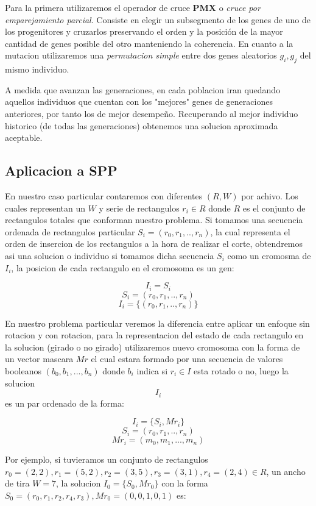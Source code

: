 \documentclass[10pt]{article}
\begin{document}
Para la primera utilizaremos el operador de cruce \textbf{PMX} o \textit{cruce por emparejamiento parcial}. Consiste en elegir un subsegmento de los genes de uno de los progenitores y cruzarlos preservando el orden y la posición de la mayor cantidad de genes posible del otro manteniendo la coherencia.
En cuanto a la mutacion utilizaremos una \textit{permutacion simple} entre dos genes aleatorios $g_i,g_j$ del mismo individuo.

A medida que avanzan las generaciones, en cada poblacion iran quedando aquellos individuos que cuentan con los "mejores"  genes de generaciones anteriores, por tanto los de mejor desempeño. Recuperando al mejor individuo historico (de todas las generaciones) obtenemos una solucion aproximada aceptable.

\subsection{Aplicacion a SPP}
En nuestro caso particular contaremos con diferentes $(R,W)$ por achivo. Los cuales representan un $W$ y serie de rectangulos $r_i \in R$ donde $R$ es el conjunto de rectangulos totales que conforman nuestro problema. Si tomamos una secuencia ordenada de rectangulos particular $S_i = (r_0,r_1,..,r_n)$, la cual representa el orden de insercion de los rectangulos a la hora de realizar el corte, obtendremos asi una solucion o individuo si tomamos dicha secuencia $S_i$ como un cromosma de $I_i$, la posicion de cada rectangulo en el cromosoma es un gen:

$$I_i = S_i$$
$$S_i = (r_0,r_1,..,r_n)$$
$$I_i = \{(r_0,r_1,..,r_n)\}$$

En nuestro problema particular veremos la diferencia entre aplicar un enfoque sin rotacion y con rotacion, para la representacion del estado de cada rectangulo en la solucion (girado o no girado) utilizaremos nuevo cromosoma con la forma de un vector mascara $Mr$ el cual estara formado por una secuencia de valores booleanos $(b_0, b_1,...,b_n)$ donde $b_i$ indica si $r_i \in I$ esta rotado o no, luego la solucion $$I_i$$ es un par ordenado de la forma:

$$I_i = \{S_i,Mr_i\}$$
$$S_i = (r_0,r_1,..,r_n)$$
$$Mr_i = (m_0, m_1,...,m_n)$$


Por ejemplo, si tuvieramos un conjunto de rectangulos $r_0=(2,2),r_1=(5,2),r_2=(3,5), r_3 = (3,1), r_4=(2,4)\in R$, un ancho de tira $W = 7$, la solucion $I_0 = \{S_0,Mr_0\}$ con la forma $S_0 = (r_0,r_1,r_2,r_4,r_3), Mr_0 = (0,0,1,0,1)$ es:
\end{document}
